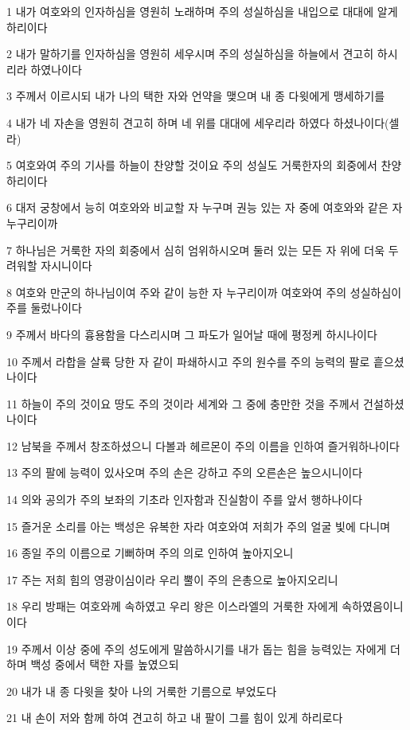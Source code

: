 \par 1 내가 여호와의 인자하심을 영원히 노래하며 주의 성실하심을 내입으로 대대에 알게 하리이다
\par 2 내가 말하기를 인자하심을 영원히 세우시며 주의 성실하심을 하늘에서 견고히 하시리라 하였나이다
\par 3 주께서 이르시되 내가 나의 택한 자와 언약을 맺으며 내 종 다윗에게 맹세하기를
\par 4 내가 네 자손을 영원히 견고히 하며 네 위를 대대에 세우리라 하였다 하셨나이다(셀라)
\par 5 여호와여 주의 기사를 하늘이 찬양할 것이요 주의 성실도 거룩한자의 회중에서 찬양하리이다
\par 6 대저 궁창에서 능히 여호와와 비교할 자 누구며 권능 있는 자 중에 여호와와 같은 자 누구리이까
\par 7 하나님은 거룩한 자의 회중에서 심히 엄위하시오며 둘러 있는 모든 자 위에 더욱 두려워할 자시니이다
\par 8 여호와 만군의 하나님이여 주와 같이 능한 자 누구리이까 여호와여 주의 성실하심이 주를 둘렀나이다
\par 9 주께서 바다의 흉용함을 다스리시며 그 파도가 일어날 때에 평정케 하시나이다
\par 10 주께서 라합을 살륙 당한 자 같이 파쇄하시고 주의 원수를 주의 능력의 팔로 흩으셨나이다
\par 11 하늘이 주의 것이요 땅도 주의 것이라 세계와 그 중에 충만한 것을 주께서 건설하셨나이다
\par 12 남북을 주께서 창조하셨으니 다볼과 헤르몬이 주의 이름을 인하여 즐거워하나이다
\par 13 주의 팔에 능력이 있사오며 주의 손은 강하고 주의 오른손은 높으시니이다
\par 14 의와 공의가 주의 보좌의 기초라 인자함과 진실함이 주를 앞서 행하나이다
\par 15 즐거운 소리를 아는 백성은 유복한 자라 여호와여 저희가 주의 얼굴 빛에 다니며
\par 16 종일 주의 이름으로 기뻐하며 주의 의로 인하여 높아지오니
\par 17 주는 저희 힘의 영광이심이라 우리 뿔이 주의 은총으로 높아지오리니
\par 18 우리 방패는 여호와께 속하였고 우리 왕은 이스라엘의 거룩한 자에게 속하였음이니이다
\par 19 주께서 이상 중에 주의 성도에게 말씀하시기를 내가 돕는 힘을 능력있는 자에게 더하며 백성 중에서 택한 자를 높였으되
\par 20 내가 내 종 다윗을 찾아 나의 거룩한 기름으로 부었도다
\par 21 내 손이 저와 함께 하여 견고히 하고 내 팔이 그를 힘이 있게 하리로다
